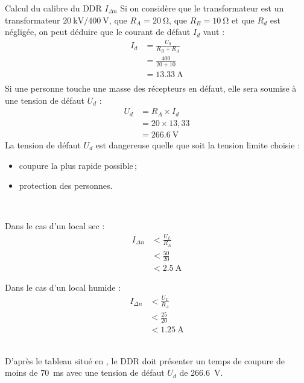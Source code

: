 \begin{exemple}{Calcul du calibre du DDR $I_{\Delta n}$}{}
Si on considère que le transformateur est un transformateur $\SI{20}{\kilo\volt}/\SI{400}{\volt}$, que $R_A=\SI{20}{\ohm}$, que $R_B=\SI{10}{\ohm}$ et que $R_d$ est négligée, on peut déduire que le courant de défaut $I_d$ vaut :
\begin{align*}
		I_d 	&= \frac{U_{0}}{R_{B}+R_{A}} \\
				&=\frac{400}{20+10} \\
				&= \SI{13,33}{\ampere} \\
\end{align*}
Si une personne touche une masse des récepteurs en défaut, elle sera soumise à une tension de défaut $U_d$ :
\begin{align*}
		U_d 	&= R_{A} \times I_{d} \\
				&=20 \times 13,33 \\
				&= \SI{266,6}{\volt}
\end{align*}
La tension de défaut $U_d$ est dangereuse quelle que soit la tension limite choisie :
\begin{itemize}
\item coupure la plus rapide possible\,;
\item protection des personnes.
\end{itemize}
~\\
\begin{minipage}[t]{0.5\linewidth}
Dans le cas d'un local sec :
\begin{align*}
	I_{\Delta n} 	&< \frac{U_{L}}{R_{A}} \\
						&< \frac{50}{20} \\
						&< \SI{2,5}{\ampere}
\end{align*}
\end{minipage}
\hfill
\begin{minipage}[t]{0.5\linewidth}
Dans le cas d'un local humide :
\begin{align*}
	I_{\Delta n} 	&< \frac{U_{L}}{R_{A}} \\
						&< \frac{25}{20} \\
						&< \SI{1,25}{\ampere}
\end{align*}
\end{minipage}
~\\
D'après le tableau situé en , le DDR doit présenter un temps de coupure de moins de \SI{70}{\milli\second} avec une tension de défaut $U_d$ de \SI{266,6}{\volt}.
\end{exemple}

%
